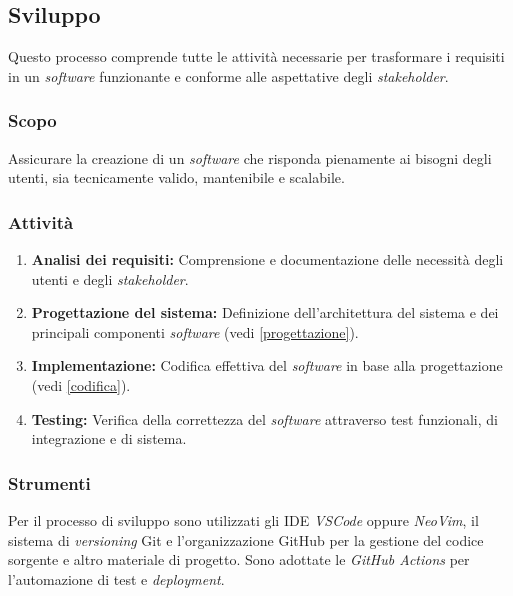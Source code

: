 \subsection{Sviluppo}

Questo processo comprende tutte le attività necessarie per trasformare i
requisiti in un \textit{software} funzionante e conforme alle aspettative degli
\textit{stakeholder}.

\subsubsection{Scopo}
Assicurare la creazione di un \textit{software} che risponda pienamente ai
bisogni degli utenti, sia tecnicamente valido, mantenibile e scalabile.

\subsubsection{Attività}
\begin{enumerate}
	\item \textbf{Analisi dei requisiti:} Comprensione e documentazione delle
	      necessità degli utenti e degli \textit{stakeholder}.
	\item \textbf{Progettazione del sistema:} Definizione dell'architettura del
	      sistema e dei principali componenti \textit{software} (vedi
	      \cref{progettazione}).
	\item \textbf{Implementazione:} Codifica effettiva del \textit{software} in
	      base alla progettazione (vedi \cref{codifica}).
	\item \textbf{Testing:} Verifica della correttezza del \textit{software}
	      attraverso test funzionali, di integrazione e di sistema.
\end{enumerate}

\subsubsection{Strumenti}
Per il processo di sviluppo sono utilizzati gli IDE \textit{VSCode} oppure
\textit{NeoVim}, il sistema di \textit{versioning} Git e l'organizzazione {GitHub\g} per la gestione del codice
sorgente e altro materiale di progetto. Sono adottate le \textit{GitHub Actions}
per l'automazione di test e \textit{deployment}.
